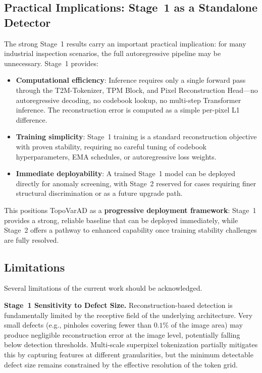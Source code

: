 \documentclass[lettersize,journal]{IEEEtran}
\begin{document}
\subsection{Practical Implications: Stage~1 as a Standalone Detector}

The strong Stage~1 results carry an important practical implication: for many industrial inspection scenarios, the full autoregressive pipeline may be unnecessary. Stage~1 provides:

\begin{itemize}
\item \textbf{Computational efficiency}: Inference requires only a single forward pass through the T2M-Tokenizer, TPM Block, and Pixel Reconstruction Head---no autoregressive decoding, no codebook lookup, no multi-step Transformer inference. The reconstruction error is computed as a simple per-pixel L1 difference.
\item \textbf{Training simplicity}: Stage~1 training is a standard reconstruction objective with proven stability, requiring no careful tuning of codebook hyperparameters, EMA schedules, or autoregressive loss weights.
\item \textbf{Immediate deployability}: A trained Stage~1 model can be deployed directly for anomaly screening, with Stage~2 reserved for cases requiring finer structural discrimination or as a future upgrade path.
\end{itemize}

This positions TopoVarAD as a \textbf{progressive deployment framework}: Stage~1 provides a strong, reliable baseline that can be deployed immediately, while Stage~2 offers a pathway to enhanced capability once training stability challenges are fully resolved.

\subsection{Limitations}

Several limitations of the current work should be acknowledged.

\textbf{Stage~1 Sensitivity to Defect Size.} Reconstruction-based detection is fundamentally limited by the receptive field of the underlying architecture. Very small defects (e.g., pinholes covering fewer than $0.1\%$ of the image area) may produce negligible reconstruction error at the image level, potentially falling below detection thresholds. Multi-scale superpixel tokenization partially mitigates this by capturing features at different granularities, but the minimum detectable defect size remains constrained by the effective resolution of the token grid.
\end{document}
